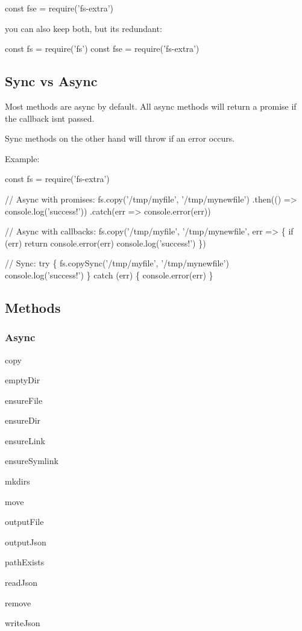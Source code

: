 \begin{DoxyCode}
const fse = require('fs-extra')
\end{DoxyCode}


you can also keep both, but it\textquotesingle{}s redundant\+:


\begin{DoxyCode}
const fs = require('fs')
const fse = require('fs-extra')
\end{DoxyCode}


\subsection*{Sync vs Async }

Most methods are async by default. All async methods will return a promise if the callback isn\textquotesingle{}t passed.

Sync methods on the other hand will throw if an error occurs.

Example\+:


\begin{DoxyCode}
const fs = require('fs-extra')

// Async with promises:
fs.copy('/tmp/myfile', '/tmp/mynewfile')
  .then(() => console.log('success!'))
  .catch(err => console.error(err))

// Async with callbacks:
fs.copy('/tmp/myfile', '/tmp/mynewfile', err => \{
  if (err) return console.error(err)
  console.log('success!')
\})

// Sync:
try \{
  fs.copySync('/tmp/myfile', '/tmp/mynewfile')
  console.log('success!')
\} catch (err) \{
  console.error(err)
\}
\end{DoxyCode}


\subsection*{Methods }

\subsubsection*{Async}


\begin{DoxyItemize}
\item copy
\item empty\+Dir
\item ensure\+File
\item ensure\+Dir
\item ensure\+Link
\item ensure\+Symlink
\item mkdirs
\item move
\item output\+File
\item output\+Json
\item path\+Exists
\item read\+Json
\item remove
\item write\+Json
\end{DoxyItemize}

